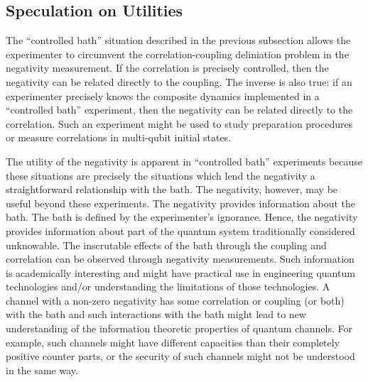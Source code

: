 \subsection{Speculation on Utilities}

The ``controlled bath'' situation described in the previous subsection allows the experimenter to circumvent the correlation-coupling deliniation problem in the negativity measurement.  If the correlation is precisely controlled, then the negativity can be related directly to the coupling.  The inverse is also true: if an experimenter precisely knows the composite dynamics implemented in a ``controlled bath'' experiment, then the negativity can be related directly to the correlation.  Such an experiment might be used to study preparation procedures or measure correlations in multi-qubit initial states.  

The utility of the negativity is apparent in ``controlled bath'' experiments because these situations are precisely the situations which lend the negativity a straightforward relationship with the bath.  The negativity, however, may be useful beyond these experiments.  The negativity provides information about the bath.  The bath is defined by the experimenter's ignorance.  Hence, the negativity provides information about part of the quantum system traditionally considered unknowable.  The inscrutable effects of the bath through the coupling and correlation can be observed through negativity measurements.  Such information is academically interesting and might have practical use in engineering quantum technologies and/or understanding the limitations of those technologies.  A channel with a non-zero negativity has some correlation or coupling (or both) with the bath and such interactions with the bath might lead to new understanding of the information theoretic properties of quantum channels.  For example, such channels might have different capacities than their completely positive counter parts, or the security of such channels might not be understood in the same way.


